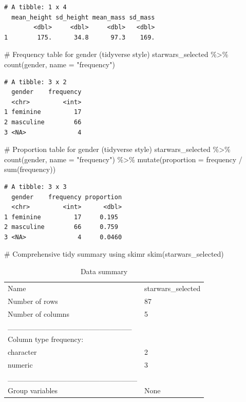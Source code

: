 \documentclass[
  man,
  floatsintext,
  longtable,
  nolmodern,
  notxfonts,
  notimes,
  colorlinks=true,linkcolor=blue,citecolor=blue,urlcolor=blue]{apa7}
\newenvironment{Shaded}{\begin{snugshade}}{\end{snugshade}}
\newcommand{\AttributeTok}[1]{\textcolor[rgb]{0.40,0.45,0.13}{#1}}
\newcommand{\CommentTok}[1]{\textcolor[rgb]{0.37,0.37,0.37}{#1}}
\newcommand{\FunctionTok}[1]{\textcolor[rgb]{0.28,0.35,0.67}{#1}}
\newcommand{\NormalTok}[1]{\textcolor[rgb]{0.00,0.23,0.31}{#1}}
\newcommand{\SpecialCharTok}[1]{\textcolor[rgb]{0.37,0.37,0.37}{#1}}
\newcommand{\StringTok}[1]{\textcolor[rgb]{0.13,0.47,0.30}{#1}}
\begin{document}
\begin{verbatim}
# A tibble: 1 x 4
  mean_height sd_height mean_mass sd_mass
        <dbl>     <dbl>     <dbl>   <dbl>
1        175.      34.8      97.3    169.
\end{verbatim}

\begin{Shaded}
\begin{Highlighting}[]
\CommentTok{\# Frequency table for gender (tidyverse style)}
\NormalTok{starwars\_selected }\SpecialCharTok{\%\textgreater{}\%}
  \FunctionTok{count}\NormalTok{(gender, }\AttributeTok{name =} \StringTok{"frequency"}\NormalTok{)}
\end{Highlighting}
\end{Shaded}

\begin{verbatim}
# A tibble: 3 x 2
  gender    frequency
  <chr>         <int>
1 feminine         17
2 masculine        66
3 <NA>              4
\end{verbatim}

\begin{Shaded}
\begin{Highlighting}[]
\CommentTok{\# Proportion table for gender (tidyverse style)}
\NormalTok{starwars\_selected }\SpecialCharTok{\%\textgreater{}\%}
  \FunctionTok{count}\NormalTok{(gender, }\AttributeTok{name =} \StringTok{"frequency"}\NormalTok{) }\SpecialCharTok{\%\textgreater{}\%}
  \FunctionTok{mutate}\NormalTok{(}\AttributeTok{proportion =}\NormalTok{ frequency }\SpecialCharTok{/} \FunctionTok{sum}\NormalTok{(frequency))}
\end{Highlighting}
\end{Shaded}

\begin{verbatim}
# A tibble: 3 x 3
  gender    frequency proportion
  <chr>         <int>      <dbl>
1 feminine         17     0.195 
2 masculine        66     0.759 
3 <NA>              4     0.0460
\end{verbatim}

\begin{Shaded}
\begin{Highlighting}[]
\CommentTok{\# Comprehensive tidy summary using skimr}
\FunctionTok{skim}\NormalTok{(starwars\_selected)}
\end{Highlighting}
\end{Shaded}

\begin{longtable}[]{@{}ll@{}}
\caption{Data summary}\tabularnewline
\toprule\noalign{}
\endfirsthead
\endhead
\bottomrule\noalign{}
\endlastfoot
Name & starwars\_selected \\
Number of rows & 87 \\
Number of columns & 5 \\
\_\_\_\_\_\_\_\_\_\_\_\_\_\_\_\_\_\_\_\_\_\_\_ & \\
Column type frequency: & \\
character & 2 \\
numeric & 3 \\
\_\_\_\_\_\_\_\_\_\_\_\_\_\_\_\_\_\_\_\_\_\_\_\_ & \\
Group variables & None \\
\end{longtable}
\end{document}
